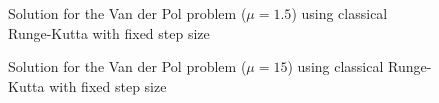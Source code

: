 \begin{figure}[H]
    \centering
    \caption{Solution for the Van der Pol problem ($\mathit{\mu = 1.5}$) using classical Runge-Kutta with fixed step size}
    \label{5_4_RK4_mu_1_5}
\end{figure}

\begin{figure}[H]
    \centering
    \caption{Solution for the Van der Pol problem ($\mathit{\mu = 15}$) using classical Runge-Kutta with fixed step size}
    \label{5_4_RK4_mu_15}
\end{figure}



